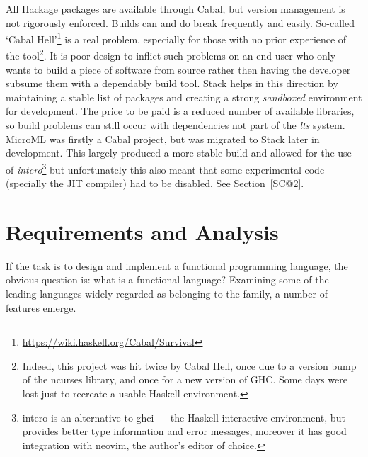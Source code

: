 \documentclass[12pt, a4paper]{report}
\begin{document}
All Hackage packages are available through Cabal, but version management is not
rigorously enforced. Builds can and do break frequently and easily. So-called `Cabal
Hell'\footnote{\url{https://wiki.haskell.org/Cabal/Survival}} is a real problem, especially for
those with no prior experience of the tool\footnote{Indeed, this project was hit twice by Cabal
Hell, once due to a version bump of the ncurses library, and once for a new version of GHC\@.
Some days were lost just to recreate a usable Haskell environment.}. It is poor design to inflict
such problems on an end user who only wants to build a piece of software from source rather then
having the developer subsume them with a dependably build tool. Stack helps in this direction by
maintaining a stable list of packages and creating a strong \textit{sandboxed} environment for
development. The price to be paid is a reduced number of available libraries, so build problems
can still occur with dependencies not part of the \textit{\gls{lts}} system. MicroML was firstly a Cabal
project, but was migrated to Stack later in development. This largely produced a more stable build
and allowed for the use of \textit{intero}\footnote{intero is an alternative to ghci --- the Haskell
interactive environment, but provides better type information and error messages, moreover it has
good integration with neovim, the author's editor of choice.} but unfortunately this also meant that some
experimental code (specially the JIT compiler) had to be disabled. See Section~\ref{SC@2}.

\chapter{Requirements and Analysis}

If the task is to design and implement a functional programming language, the obvious question is:
what is a functional language? Examining some of the leading languages widely regarded as belonging
to the family, a number of features emerge.
\end{document}
